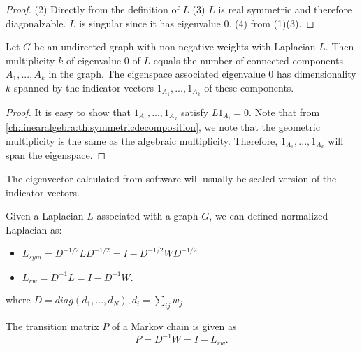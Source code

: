 \begin{refsection}
\begin{proof}
	(2) Directly from the definition of $L$
	(3) $L$ is real symmetric and therefore diagonalzable. $L$ is singular since it has eigenvalue 0. (4) from (1)(3).
\end{proof}  


\begin{lemma}\cite{von2007tutorial}
	Let $G$ be an undirected graph with non-negative weights with Laplacian $L$. Then multiplicity $k$ of eigenvalue 0 of $L$ equals the number of connected components $A_1,...,A_k$ in the graph. The eigenspace associated eigenvalue 0 has dimensionality $k$ spanned by the indicator vectors $1_{A_1},...,1_{A_k}$ of these components.  
\end{lemma}
\begin{proof}
	It is easy to show that $1_{A_1},...,1_{A_k}$ satisfy $L1_{A_i} = 0$. Note that from  \autoref{ch:linearalgebra:th:symmetricdecomposition}, we note that the geometric multiplicity is the same as the algebraic multiplicity. Therefore,  $1_{A_1},...,1_{A_k}$ will span the eigenspace. 
\end{proof}

\begin{remark}[eigenvectors]
	The eigenvector calculated from software will usually be scaled version of the indicator vectors. 
\end{remark}


\begin{definition}\cite{von2007tutorial}\label{ch:linearalgebra:def:normalizedgraphLaplacian}
	Given a Laplacian $L$ associated with a graph $G$, we can defined normalized Laplacian as:
	\begin{itemize}
		\item $L_{sym} = D^{-1/2}LD^{-1/2} = I - D^{-1/2}WD^{-1/2}$
		\item $L_{rw} = D^{-1}L = I - D^{-1}W.$
	\end{itemize}
	where $D=diag(d_1,...,d_N), d_i = \sum_{ij}w_j$.
\end{definition}


\begin{remark}
	The transition matrix $P$ of a Markov chain is given as
	$$P = D^{-1}W = I - L_{rw}.$$
\end{remark}



\end{refsection}
